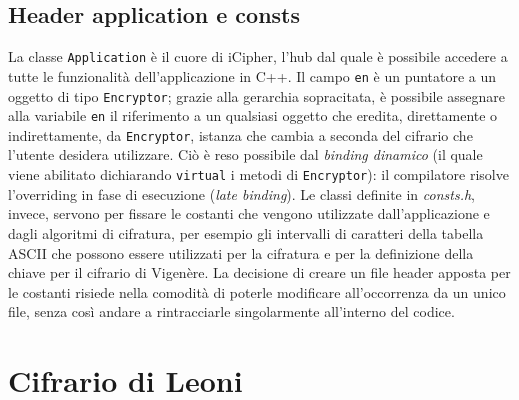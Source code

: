 \documentclass[a4paper, 12pt, one column, aas_macros]{article}
\begin{document}
	\subsection{Header application e consts}
	La classe \verb|Application| è il cuore di iCipher, l'hub dal quale è possibile accedere a tutte le funzionalità dell'applicazione in C++. Il campo \verb|en| è un puntatore a un oggetto di tipo \verb|Encryptor|; grazie alla gerarchia sopracitata, è possibile assegnare alla variabile \verb|en| il riferimento a un qualsiasi oggetto che eredita, direttamente o indirettamente, da \verb|Encryptor|, istanza che cambia a seconda del cifrario che l'utente desidera utilizzare. Ciò è reso possibile dal \textit{binding dinamico} (il quale viene abilitato dichiarando \verb|virtual| i metodi di \verb|Encryptor|): il compilatore risolve l'overriding in fase di esecuzione (\textit{late binding}). Le classi definite in \textit{consts.h}, invece, servono per fissare le costanti che vengono utilizzate dall'applicazione e dagli algoritmi di cifratura, per esempio gli intervalli di caratteri della tabella ASCII che possono essere utilizzati per la cifratura e per la definizione della chiave per il cifrario di Vigenère. La decisione di creare un file header apposta per le costanti risiede nella comodità di poterle modificare all'occorrenza da un unico file, senza così andare a rintracciarle singolarmente all'interno del codice. 

	\section{Cifrario di Leoni}
	
\end{document}
